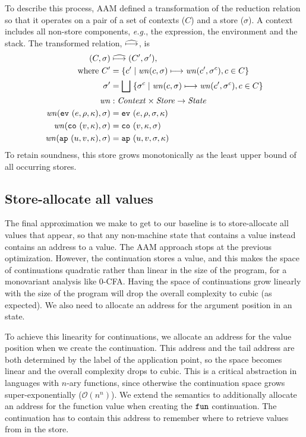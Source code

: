 \documentclass[9pt]{sigplanconf} %
\begin{document}
To describe this process, AAM defined a transformation of the reduction relation so that it operates on a pair of a set of contexts ($C$) and a store ($\sigma$).
%
A context includes all non-store components, \emph{e.g.}, the expression, the environment and the stack.
%
The transformed relation, $\widehat{\mathbin{\longmapsto}}$, is
%
{\small
\begin{align*}
(C, \sigma) &\mathrel{\widehat{\mathbin{\longmapsto}}} (C', \sigma'), \\
\mbox{where } C' &= \{c' \mid \mathit{wn}(c, \sigma) \mathrel{\mathbin{\longmapsto}} \mathit{wn}(c', \sigma^c), c \in C\} \\
              \sigma' &= \bigsqcup\; \{\sigma^c \mid \mathit{wn}(c,\sigma)\mathrel{\mathbin{\longmapsto}} \mathit{wn}(c', \sigma^c), c \in C\} \\
\mathit{wn} &: \mathit{Context} \times \mathit{Store} \to \mathit{State} \\
\mathit{wn}({\tt ev}{\ }({e, \rho, \kappa}), \sigma) &= {\tt ev}{\ }({e, \rho, \sigma, \kappa}) \\
\mathit{wn}({\tt co}{\ }({v, \kappa}), \sigma) &= {\tt co}{\ }({v, \kappa, \sigma}) \\
\mathit{wn}({\tt ap}{\ }({u, v, \kappa}), \sigma) &= {\tt ap}{\ }({u, v, \sigma, \kappa}) \\
\end{align*}}
%
To retain soundness, this store grows monotonically as the least upper bound of all occurring stores.
%

\subsection{Store-allocate all values}
\label{sec:baselineeval}

The final approximation we make to get to our baseline is to store-allocate all values that appear, so that any non-machine state that contains a value instead contains an address to a value.
%
The AAM approach stops at the previous optimization.
%
However, the \kfnalone continuation stores a value, and this makes the space of continuations quadratic rather than linear in the size of the program, for a monovariant analysis like 0-CFA.
%
Having the space of continuations grow linearly with the size of the program will drop the overall complexity to cubic (as expected).
%
We also need to allocate an address for the argument position in an \apalone state.

To achieve this linearity for continuations, we allocate an address for the value position when we create the continuation.
%
This address and the tail address are both determined by the label of the application point, so the space becomes linear and the overall complexity drops to cubic.
%
This is a critical abstraction in languages with $n$-ary functions, since otherwise the continuation space grows super-exponentially (${\mathcal O}(n^n)$).
%
We extend the semantics to additionally allocate an address for the function value when creating the ${\tt fun}$ continuation.
%
The continuation has to contain this address to remember where to retrieve values from in the store.
\end{document}
